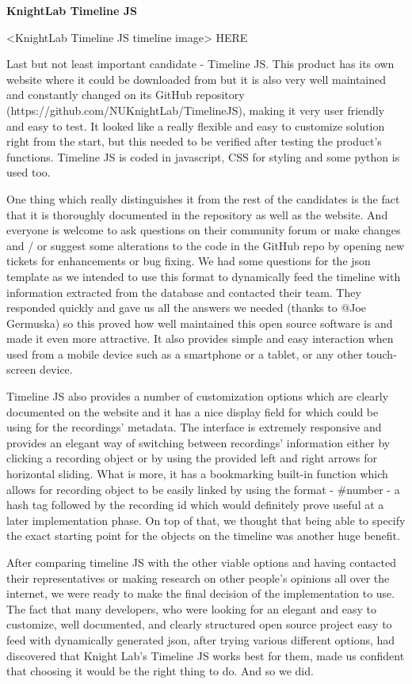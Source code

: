 \documentclass{l3proj}
\begin{document}
\textbf{KnightLab Timeline JS}

<KnightLab Timeline JS timeline image> HERE

Last but not least important candidate - Timeline JS. This product has its own website where it could be downloaded from but it is also very well maintained and constantly changed on its GitHub repository (https://github.com/NUKnightLab/TimelineJS), making it very user friendly and easy to test. It looked like a really flexible and easy to customize solution right from the start, but this needed to be verified after testing the product’s functions. Timeline JS is coded in javascript, CSS for styling and some python is used too.

One thing which really distinguishes it from the rest of the candidates is the fact that it is thoroughly documented in the repository as well as the website. And everyone is welcome to ask questions on their community forum or make changes and / or suggest some alterations to the code in the GitHub repo by opening new tickets for enhancements or bug fixing. We had some questions for the json template as we intended to use this format to dynamically feed the timeline with information extracted from the database and contacted their team. They responded quickly and gave us all the answers we needed (thanks to @Joe Germuska) so this proved how well maintained this open source software is and made it even more attractive. It also provides simple and easy interaction when used from a mobile device such as a smartphone or a tablet, or any other touch-screen device.

Timeline JS also provides a number of customization options which are clearly documented on the website and it has a nice display field for which could be using for the recordings’ metadata. The interface is extremely responsive and provides an elegant way of switching between recordings’ information either by clicking a recording object or by using the provided left and right arrows for horizontal sliding. What is more, it has a bookmarking built-in function which allows for recording object to be easily linked by using the format - #number - a hash tag followed by the recording id which would definitely prove useful at a later implementation phase. On top of that, we thought that being able to specify the exact starting point for the objects on the timeline was another huge benefit.

After comparing timeline JS with the other viable options and having contacted their representatives or making research on other people’s opinions all over the internet, we were ready to make the final decision of the implementation to use. The fact that many developers, who were looking for an elegant and easy to customize, well documented, and clearly structured open source project easy to feed with dynamically generated json, after trying various different options, had discovered that Knight Lab’s Timeline JS works best for them, made us confident that choosing it would be the right thing to do. And so we did.
\end{document}
